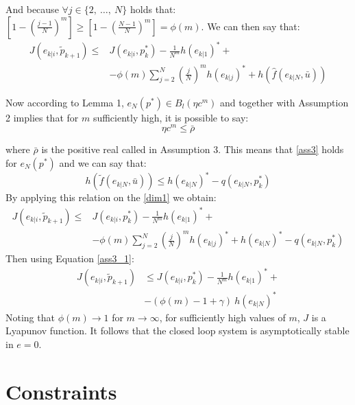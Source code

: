 And because $\forall j \in \lbrace2,\ \dots,\ N\rbrace$ holds that: 
$\left[ 1-\left(\frac{j-1}{N}\right)^m \right]\ge\left[ 1-\left(\frac{N-1}{N}\right)^m \right]= \phi(m)$. We can then say that: 
\begin{equation}\label{dim1}
    \begin{split}
        J({e}_{k|i},\tilde{p}_{k+1})\le &J({e}_{k|i},p_{k}^*) - \frac{1}{N^m}h(e_{k|1})^*+ \\ 
        &-\phi(m)\sum_{j=2}^{N}\left(\frac{j}{N}\right)^m h(e_{k|j})^*+ h(\hat{f}(e_{k|N},\bar{u}))
    \end{split}
\end{equation}

Now according to Lemma 1, $e_N(p^*) \in B_l(\eta c^m)$ and together with Assumption 2 implies that for $m$ sufficiently high, it is possible to say:
\begin{equation}
\eta c^m \leq \bar{\rho}
\end{equation}

where $\bar{\rho}$ is the positive real called in Assumption 3.
This means that \ref{ass3} holds for $e_N(p^*)$ and we can say that:
\begin{equation*}
    h(\tilde{f}(e_{k|N},\bar{u})) \le h(e_{k|N})^*-q(e_{k|N},p_k^*)
\end{equation*}
By applying this relation on the \ref{dim1} we obtain: 
\begin{equation*}
    \begin{split}
        J({e}_{k|i},\tilde{p}_{k+1})\le &J({e}_{k|i},p_{k}^*) - \frac{1}{N^m}h(e_{k|1})^*+ \\ 
        &-\phi(m)\sum_{j=2}^{N}\left(\frac{j}{N}\right)^m h(e_{k|j})^*+ h(e_{k|N})^*-q(e_{k|N},p_k^*)
    \end{split}
\end{equation*}
Then using Equation \ref{ass3_1}:
\begin{equation*}
    \begin{split}
        J({e}_{k|i},\tilde{p}_{k+1})&\le J({e}_{k|i},p_{k}^*) - \frac{1}{N^m}h(e_{k|1})^*+ \\ 
            &-(\phi(m)-1+\gamma)\ h(e_{k|N})^*
    \end{split}
\end{equation*}
Noting that $\phi(m) \rightarrow 1$ for $m \rightarrow \infty$, for sufficiently high values of $m$, $J$ is a Lyapunov function. It follows that the closed loop system is asymptotically stable in $e=0$.

\section{Constraints}

